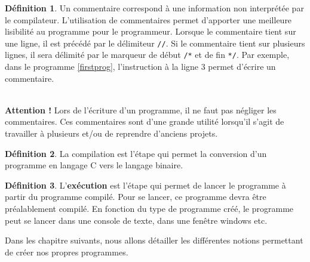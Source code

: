 \documentclass[a4paper,11pt]{book}
\newenvironment{warning} 
   {~\\ \textbf{Attention !}}{\\}
\theoremstyle{definition}
\newtheorem*{definition}{Définition}
\begin{document}
\begin{definition}
Un commentaire correspond à une information non interprétée par le
compilateur. L'utilisation de commentaires permet d'apporter une
meilleure lisibilité au programme pour le programmeur. Lorsque le
commentaire tient sur une ligne, il est précédé par le délimiteur
\texttt{//}. Si le commentaire tient sur plusieurs lignes, il sera
délimité par le marqueur de début \texttt{/*} et de fin
\texttt{*/}. Par exemple, dans le programme \ref{firstprog},
l'instruction à la ligne 3 permet d'écrire un commentaire.
\end{definition}

\begin{warning}
Lors de l'écriture d'un programme, il ne faut pas négliger les commentaires. Ces commentaires sont d'une grande utilité lorsqu'il s'agit de travailler à plusieurs et/ou de reprendre d'anciens projets.
\end{warning}

\begin{definition}
La compilation est l'étape qui permet la conversion d'un programme
en langage C vers le langage binaire.
\end{definition}

\begin{definition}
L'\textbf{exécution} est l'étape qui permet de lancer le programme à partir du programme compilé. Pour se lancer, ce programme devra être préalablement compilé. En fonction du type de programme créé, le programme peut se lancer dans une console de texte, dans une fenêtre windows etc.
\end{definition}

Dans les chapitre suivants, nous allons détailler les différentes notions permettant de créer nos propres programmes.
\end{document}
